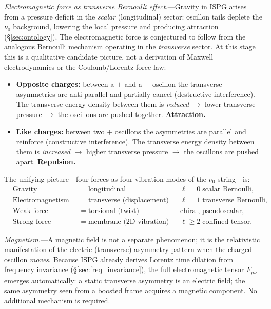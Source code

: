 \documentclass[11pt]{article}
\begin{document}
\textit{Electromagnetic force as transverse
Bernoulli effect.}---Gravity in ISPG arises
from a pressure deficit in the \emph{scalar}
(longitudinal) sector: oscillon tails deplete
the $\nu_0$ background, lowering the local
pressure and producing attraction
(\S\ref{sec:ontology}).  The electromagnetic
force is conjectured to follow from the analogous
Bernoulli mechanism operating in the \emph{transverse}
sector.  At this stage this is a qualitative candidate
picture, not a derivation of Maxwell electrodynamics or
the Coulomb/Lorentz force law:
\begin{itemize}
  \item \textbf{Opposite charges:}\;
    between a $+$ and a $-$ oscillon the
    transverse asymmetries are anti-parallel
    and partially cancel (destructive
    interference).  The transverse energy density
    between them is \emph{reduced} $\to$ lower
    transverse pressure $\to$ the oscillons are
    pushed together.  \textbf{Attraction.}

  \item \textbf{Like charges:}\;
    between two $+$ oscillons the asymmetries
    are parallel and reinforce (constructive
    interference).  The transverse energy density
    between them is \emph{increased} $\to$ higher
    transverse pressure $\to$ the oscillons are
    pushed apart.  \textbf{Repulsion.}
\end{itemize}

\noindent
The unifying picture---four forces as four
vibration modes of the $\nu_0$-string---is:
\begin{equation}\label{eq:bernoulli_unified}
\boxed{
\begin{aligned}
  &\text{Gravity}
  &&=\; \text{longitudinal (compression)}
  &&\quad\ell = 0\;\text{scalar Bernoulli},\\
  &\text{Electromagnetism}
  &&=\; \text{transverse (displacement)}
  &&\quad\ell = 1\;\text{transverse Bernoulli},\\
  &\text{Weak force}
  &&=\; \text{torsional (twist)}
  &&\quad\text{chiral, pseudoscalar},\\
  &\text{Strong force}
  &&=\; \text{membrane (2D vibration)}
  &&\quad\ell \geq 2\;\text{confined tensor}.
\end{aligned}
}
\end{equation}

\textit{Magnetism.}---A magnetic field is not
a separate phenomenon; it is the relativistic
manifestation of the electric (transverse)
asymmetry pattern when the charged oscillon
\emph{moves}.  Because ISPG already derives
Lorentz time dilation from frequency invariance
(\S\ref{sec:freq_invariance}), the full
electromagnetic tensor $F_{\mu\nu}$ emerges
automatically: a static transverse asymmetry
is an electric field; the same asymmetry seen
from a boosted frame acquires a magnetic
component.  No additional mechanism is required.
\end{document}
